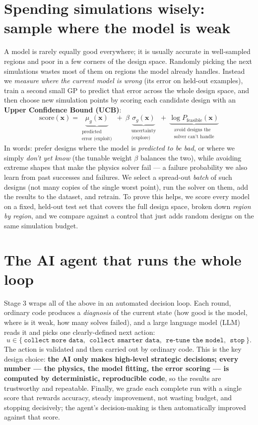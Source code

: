\documentclass[10pt]{article}
\newcommand{\bx}{\mathbf{x}}\newcommand{\bz}{\mathbf{z}}\newcommand{\by}{\mathbf{y}}
\begin{document}
\section{Spending simulations wisely: sample where the model is weak}
A model is rarely equally good everywhere; it is usually accurate in well-sampled regions and poor
in a few corners of the design space. Randomly picking the next simulations wastes most of them on
regions the model already handles. Instead we \emph{measure where the current model is wrong} (its
error on held-out examples), train a second small GP to predict that error across the whole design
space, and then choose new simulation points by scoring each candidate design with an
\textbf{Upper Confidence Bound (UCB)}:
$$
\boxed{\ \text{score}(\bx)=\underbrace{\mu_g(\bx)}_{\substack{\text{predicted}\\\text{error (exploit)}}}\ +\ \beta\underbrace{\sigma_g(\bx)}_{\substack{\text{uncertainty}\\\text{(explore)}}}\ +\ \underbrace{\log P_{\text{feasible}}(\bx)}_{\substack{\text{avoid designs the}\\\text{solver can't handle}}}\ }
$$
In words: prefer designs where the model is \emph{predicted to be bad}, or where we simply
\emph{don't yet know} (the tunable weight $\beta$ balances the two), while avoiding extreme shapes
that make the physics solver fail --- a failure probability we also learn from past successes and
failures. We select a spread-out \emph{batch} of such designs (not many copies of the single worst
point), run the solver on them, add the results to the dataset, and retrain. To prove this helps,
we score every model on a fixed, held-out test set that covers the full design space, broken down
\emph{region by region}, and we compare against a control that just adds random designs on the same
simulation budget.

\section{The AI agent that runs the whole loop}
Stage 3 wraps all of the above in an automated decision loop. Each round, ordinary code produces a
\emph{diagnosis} of the current state (how good is the model, where is it weak, how many solves
failed), and a large language model (LLM) reads it and picks one clearly-defined next action:
$$u\in\{\ \texttt{collect more data},\ \ \texttt{collect smarter data},\ \ \texttt{re-tune the model},\ \ \texttt{stop}\ \}.$$
The action is validated and then carried out by ordinary code. This is the key design choice:
\textbf{the AI only makes high-level strategic decisions; every number --- the physics, the model
fitting, the error scoring --- is computed by deterministic, reproducible code}, so the results are
trustworthy and repeatable. Finally, we grade each complete run with a single score that rewards
accuracy, steady improvement, not wasting budget, and stopping decisively; the agent's
decision-making is then automatically improved against that score.
\end{document}
